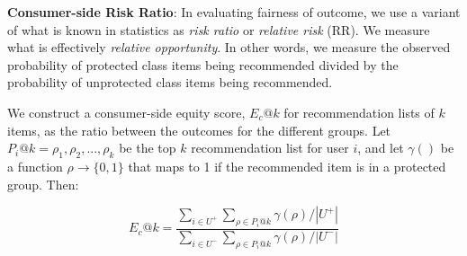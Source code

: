         
        
        
        

        
        
        
        \textbf{Consumer-side Risk Ratio}: In evaluating fairness of outcome, we use a variant of what is known in statistics as \textit{risk ratio} or \textit{relative risk} (RR)\cite{romei2014multidisciplinary}. We measure what is effectively \textit{relative opportunity}. In other words, we measure the observed probability of protected class items being recommended divided by the probability of unprotected class items being recommended.
        
        We construct a consumer-side equity score, $E_c@k$ for recommendation lists of $k$ items, as the ratio between the outcomes for the different groups. Let $P_i@k = {\rho_1, \rho_2, ..., \rho_k}$ be the top $k$ recommendation list for user $i$, and let $\gamma()$ be a function $\rho \rightarrow \{0,1\}$ that maps to 1 if the recommended item is in a protected group. Then:

        \begin{equation}
        E_c@k=\frac{\sum_{i \in U^+}{\sum_{\rho \in P_i@k}{\gamma(\rho)}}/|U^+|}
        {\sum_{i \in U^-}{\sum_{\rho \in P_i@k}{\gamma(\rho)}}/|U^-|}
        \end{equation}
        
